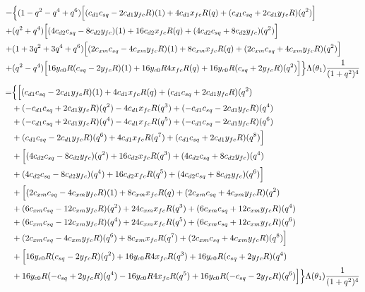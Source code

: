 \documentclass[12pt]{article}
\begin{document}
\begin{align}
    =& \Bigl\{ (1-q^2 -q^4+q^6)\Bigl[ (c_{d1}c_{sq} -2c_{d1}y_{fc}R)(1) +4c_{d1}x_{fc}R(q)  +(c_{d1}c_{sq} +2c_{d1}y_{fc}R)(q^2) \Bigr] \nonumber\\
    +& (q^2+q^4)\Bigl[ (4c_{d2}c_{sq} -8c_{d2}y_{fc})(1) +16c_{d2}x_{fc}R(q)  +(4c_{d2}c_{sq} +8c_{d2}y_{fc})(q^2) \Bigr]  \nonumber\\
    +& (1+3q^2+3q^4+q^6) \Bigl[ (2c_{xm}c_{sq} -4c_{xm}y_{fc}R )(1) + 8c_{xm}x_{fc}R(q)  +(2c_{xm}c_{sq}+ 4c_{xm}y_{fc}R)(q^2) \Big] \nonumber \\
    +& (q^2-q^4)\Bigl[ 16y_{c0}R(c_{sq}-2y_{fc}R)(1) +16y_{c0}R4x_{fc}R(q)  + 16y_{c0}R(c_{sq} + 2y_{fc}R)(q^2) \Big] \Bigr\}\Lambda(\theta_1)\frac{1}{(1+q^2)^4}
\end{align}
\begin{align}
    =& \Bigl\{ \Bigl[ (c_{d1}c_{sq} -2c_{d1}y_{fc}R)(1) +4c_{d1}x_{fc}R(q)  +(c_{d1}c_{sq} +2c_{d1}y_{fc}R)(q^2) \nonumber\\
    &+ (-c_{d1}c_{sq} +2c_{d1}y_{fc}R)(q^2) -4c_{d1}x_{fc}R(q^3)  +(-c_{d1}c_{sq} -2c_{d1}y_{fc}R)(q^4) \nonumber\\
    &+ (-c_{d1}c_{sq} +2c_{d1}y_{fc}R)(q^4) -4c_{d1}x_{fc}R(q^5)  +(-c_{d1}c_{sq} -2c_{d1}y_{fc}R)(q^6) \nonumber\\
    &+ (c_{d1}c_{sq} -2c_{d1}y_{fc}R)(q^6) +4c_{d1}x_{fc}R(q^7)  +(c_{d1}c_{sq} +2c_{d1}y_{fc}R)(q^8)  \Bigr] \nonumber\\
    &+ \Bigl[ (4c_{d2}c_{sq} -8c_{d2}y_{fc})(q^2) +16c_{d2}x_{fc}R(q^3)  +(4c_{d2}c_{sq} +8c_{d2}y_{fc})(q^4) \nonumber\\
    &+ (4c_{d2}c_{sq} -8c_{d2}y_{fc})(q^4) +16c_{d2}x_{fc}R(q^5)  +(4c_{d2}c_{sq} +8c_{d2}y_{fc})(q^6) \Bigr]  \nonumber\\
    &+ \Bigl[ (2c_{xm}c_{sq} -4c_{xm}y_{fc}R )(1) + 8c_{xm}x_{fc}R(q)  +(2c_{xm}c_{sq}+ 4c_{xm}y_{fc}R)(q^2) \nonumber\\
    &+ (6c_{xm}c_{sq} -12c_{xm}y_{fc}R )(q^2) + 24c_{xm}x_{fc}R(q^3)  +(6c_{xm}c_{sq}+ 12c_{xm}y_{fc}R)(q^4) \nonumber\\
    &+ (6c_{xm}c_{sq} -12c_{xm}y_{fc}R )(q^4) + 24c_{xm}x_{fc}R(q^5)  +(6c_{xm}c_{sq}+ 12c_{xm}y_{fc}R)(q^6) \nonumber\\
    &+ (2c_{xm}c_{sq} -4c_{xm}y_{fc}R )(q^6) + 8c_{xm}x_{fc}R(q^7)  +(2c_{xm}c_{sq}+ 4c_{xm}y_{fc}R)(q^8)  \Big] \nonumber \\
    &+ \Bigl[ 16y_{c0}R(c_{sq}-2y_{fc}R)(q^2) +16y_{c0}R4x_{fc}R(q^3)  + 16y_{c0}R(c_{sq} + 2y_{fc}R)(q^4) \nonumber\\
    &+ 16y_{c0}R(-c_{sq}+2y_{fc}R)(q^4) -16y_{c0}R4x_{fc}R(q^5)  + 16y_{c0}R(-c_{sq} - 2y_{fc}R)(q^6) \Big] \Bigr\}\Lambda(\theta_1)\frac{1}{(1+q^2)^4}
\end{align}
\end{document}
